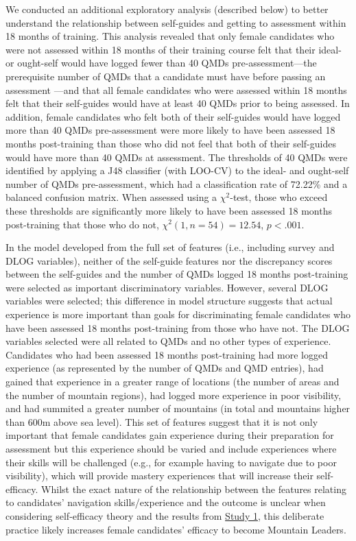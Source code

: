 \documentclass[
  12pt,
  a4paper,
]{book}
\begin{document}
We conducted an additional exploratory analysis (described below) to better understand the relationship between self-guides and getting to assessment within 18 months of training. This analysis revealed that only female candidates who were not assessed within 18 months of their training course felt that their ideal- or ought-self would have logged fewer than 40 QMDs pre-assessment---the prerequisite number of QMDs that a candidate must have before passing an assessment \citep{MTUK2015a}---and that all female candidates who were assessed within 18 months felt that their self-guides would have at least 40 QMDs prior to being assessed. In addition, female candidates who felt both of their self-guides would have logged more than 40 QMDs pre-assessment were more likely to have been assessed 18 months post-training than those who did not feel that both of their self-guides would have more than 40 QMDs at assessment. The thresholds of 40 QMDs were identified by applying a J48 classifier (with LOO-CV) to the ideal- and ought-self number of QMDs pre-assessment, which had a classification rate of 72.22\% and a balanced confusion matrix. When assessed using a \(\chi^2\)-test, those who exceed these thresholds are significantly more likely to have been assessed 18 months post-training that those who do not, \(\chi^2(1, n = 54) = 12.54\), \(p < .001\).

In the model developed from the full set of features (i.e., including survey and DLOG variables), neither of the self-guide features nor the discrepancy scores between the self-guides and the number of QMDs logged 18 months post-training were selected as important discriminatory variables. However, several DLOG variables were selected; this difference in model structure suggests that actual experience is more important than goals for discriminating female candidates who have been assessed 18 months post-training from those who have not. The DLOG variables selected were all related to QMDs and no other types of experience. Candidates who had been assessed 18 months post-training had more logged experience (as represented by the number of QMDs and QMD entries), had gained that experience in a greater range of locations (the number of areas and the number of mountain regions), had logged more experience in poor visibility, and had summited a greater number of mountains (in total and mountains higher than 600m above sea level). This set of features suggest that it is not only important that female candidates gain experience during their preparation for assessment but this experience should be varied and include experiences where their skills will be challenged (e.g., for example having to navigate due to poor visibility), which will provide mastery experiences that will increase their self-efficacy. Whilst the exact nature of the relationship between the features relating to candidates' navigation skills/experience and the outcome is unclear when considering self-efficacy theory and the results from \protect\hyperlink{ml-qualitative}{Study 1}, this deliberate practice likely increases female candidates' efficacy to become Mountain Leaders.
\end{document}
